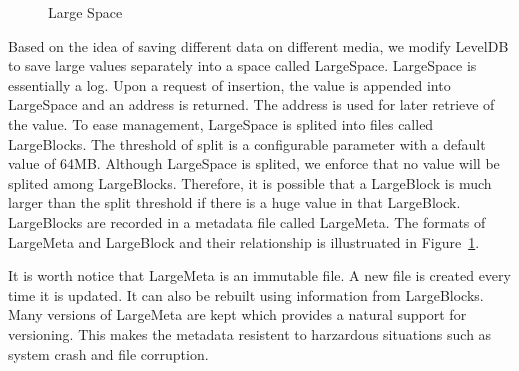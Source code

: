 \begin{figure}[t]
\begin{centering}
\caption{Large Space}
\label{fig:space}
\end{centering}
\end{figure}

Based on the idea of saving different data on different media, we
modify LevelDB to save large values separately into a space called
LargeSpace. LargeSpace is essentially a log. Upon a request of
insertion, the value is appended into LargeSpace and an address is
returned. The address is used for later retrieve of the value. To ease
management, LargeSpace is splited into files called LargeBlocks. The
threshold of split is a configurable parameter with a default value of
64MB. Although LargeSpace is splited, we enforce that no value will be
splited among LargeBlocks. Therefore, it is possible that a LargeBlock
is much larger than the split threshold if there is a huge value in
that LargeBlock. LargeBlocks are recorded in a metadata file called
LargeMeta. The formats of LargeMeta and LargeBlock and their
relationship is illustruated in Figure~\ref{fig:space}.

It is worth notice that LargeMeta is an immutable file. A new file is
created every time it is updated. It can also be rebuilt using
information from LargeBlocks. Many versions of LargeMeta are kept
which provides a natural support for versioning. This makes the
metadata resistent to harzardous situations such as system crash and
file corruption.




